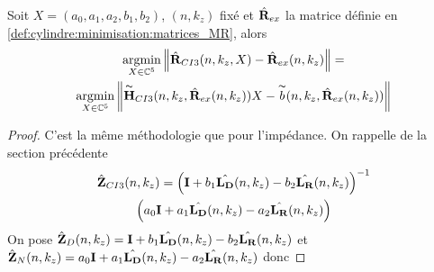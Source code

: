     \begin{prop}
      Soit \(X = (a_0,a_1,a_2,b_1,b_2)\), \((n,k_z)\) fixé et \(\hat{\mathbf{R}}_{ex}\) la matrice définie en \ref{def:cylindre:minimisation:matrices_MR}, alors
      \begin{multline*}
        {\underset{X\in\mathbb C^5}{\operatorname{argmin}}} \left\lVert\hat{\mathbf{R}}_{CI3}(n,k_z,X) - \hat{\mathbf{R}}_{ex}(n,k_z)\right\rVert =
        \\
        {\underset{X\in\mathbb C^5}{\operatorname{argmin}}} \left\lVert\overset{\thicksim}{\mathbf{H}}_{CI3}(n,k_z,\hat{\mathbf{R}}_{ex}(n,k_z))X - \overset{\thicksim}{b}(n,k_z,\hat{\mathbf{R}}_{ex}(n,k_z))\right\rVert
      \end{multline*}
    \end{prop}

    \begin{proof}
      C'est la même méthodologie que pour l'impédance.
      On rappelle de la section précédente
      \begin{multline*}
        \hat{\mathbf{Z}}_{CI3}(n,k_z) = \left(\mathbf{I} + b_1 \hat{\mathbf{L_D}}(n,k_z) - b_2 \hat{\mathbf{L_R}}(n,k_z) \right)^{-1}
        \\
        \left(a_0 \mathbf{I} + a_1 {\hat{\mathbf{L_D}}(n,k_z)} - a_2 {\hat{\mathbf{L_R}}(n,k_z)}\right)
      \end{multline*}
      On pose \(\hat{\mathbf{Z}}_D(n,k_z) = \mathbf{I} + b_1 \hat{\mathbf{L_D}}(n,k_z) - b_2 \hat{\mathbf{L_R}}(n,k_z)\) et \(\hat{\mathbf{Z}}_N(n,k_z) = a_0 \mathbf{I} + a_1 {\hat{\mathbf{L_D}}(n,k_z)} - a_2 {\hat{\mathbf{L_R}}(n,k_z)}\) donc


\end{proof}
